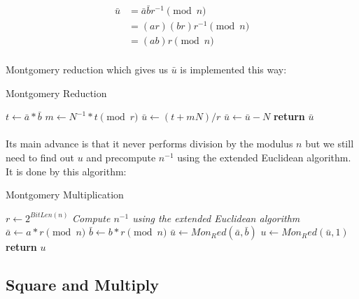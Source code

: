 \documentclass[thesis=B,english]{FITthesis}[2012/10/20]
\begin{document}
{\begin{equation}
\begin{split}
\bar{u} & = \bar{a}\bar{b}r^{-1} \pmod{n} \\
 & = (ar)(br)r^{-1} \pmod{n} \\
 & = (ab)r \pmod{n}
\end{split}
\end{equation}
\medskip

\paragraph*{}{
Montgomery reduction which gives us \(\bar{u}\) is implemented this way:
}

\begin{algorithm}[H]
\caption{Montgomery Reduction}
\begin{algorithmic}[1]
 \State $t \gets\bar{a} *\bar{b}$
 \State $m \gets N^{-1} * t \pmod{r}$
 \State $\bar{u} \gets (t + mN) / r$
  \State $\bar{u} \gets\bar{u} - N$
 \EndIf
\State \textbf{return} $\bar{u}$
\EndFunction
\end{algorithmic}
\end{algorithm}

\paragraph*{}
{
Its main advance is that it never performs division by the modulus \(n\) but we still need to find out \(u\) and precompute \(n^{-1}\) using the extended Euclidean algorithm.
It is done by this algorithm: }

\begin{algorithm}[H]
\caption{Montgomery Multiplication}
\begin{algorithmic}[1]
 \State $r \gets 2^{BitLen(n)}$
 \State \textit{Compute \(n^{-1}\) using the extended Euclidean algorithm}
 \State $\bar{a} \gets a *r \pmod{n}$
 \State $\bar{b} \gets b * r \pmod{n}$
 \State $\bar{u} \gets Mon_Red(\bar{a}, \bar{b})$
 \State $u \gets Mon_Red(\bar{u}, 1)$
 \State \textbf{return} $u$
\EndFunction
\end{algorithmic}
\end{algorithm}


\subsection{Square and Multiply}
}
\end{document}
